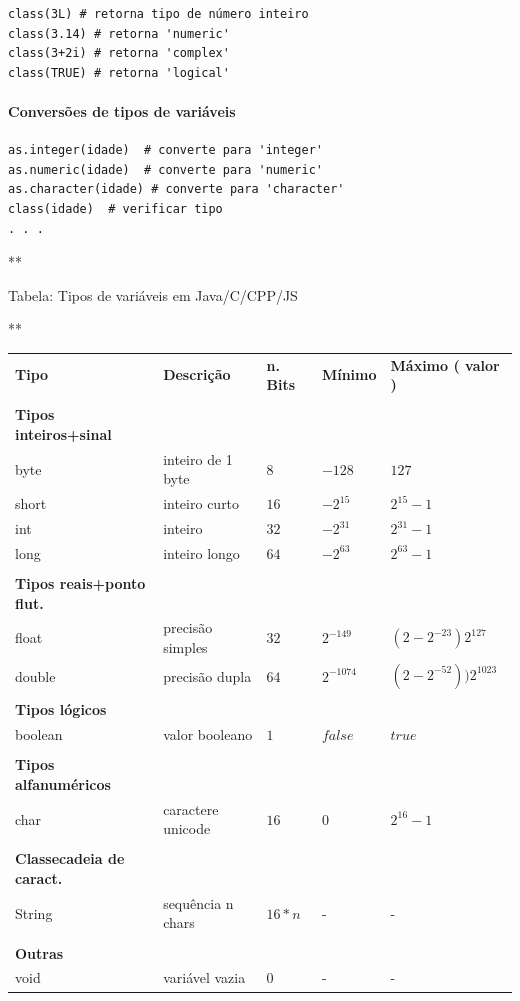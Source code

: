 \documentclass[12pt,a4paper]{article}
\begin{document}
\begin{verbatim}
class(3L) # retorna tipo de número inteiro
class(3.14) # retorna 'numeric'
class(3+2i) # retorna 'complex'
class(TRUE) # retorna 'logical'
\end{verbatim}

    \hypertarget{conversuxf5es-de-tipos-de-variuxe1veis}{%
\paragraph{Conversões de tipos de
variáveis}\label{conversuxf5es-de-tipos-de-variuxe1veis}}

    \begin{verbatim}
as.integer(idade)  # converte para 'integer'
as.numeric(idade)  # converte para 'numeric'
as.character(idade) # converte para 'character'
class(idade)  # verificar tipo
. . .
\end{verbatim}

    **

Tabela: Tipos de variáveis em Java/C/CPP/JS

**

\begin{longtable}[]{@{}lllll@{}}
\toprule
\endhead
\textbf{Tipo} & \textbf{Descrição} & \textbf{n. Bits} & \textbf{Mínimo}
& \textbf{Máximo ( valor )}\tabularnewline
& & & &\tabularnewline
\textbf{Tipos inteiros+sinal} & & & &\tabularnewline
byte & inteiro de 1 byte & \(8\) & \(-128\) & \(127\)\tabularnewline
short & inteiro curto & \(16\) & \(-2^{15}\) &
\(2^{15}-1\)\tabularnewline
int & inteiro & \(32\) & \(-2^{31}\) & \(2^{31}-1\)\tabularnewline
long & inteiro longo & \(64\) & \(-2^{63}\) &
\(2^{63}-1\)\tabularnewline
& & & &\tabularnewline
\textbf{Tipos reais+ponto flut.} & & & &\tabularnewline
float & precisão simples & \(32\) & \(2^{-149}\) &
\((2-2^{-23})2^{127}\)\tabularnewline
double & precisão dupla & \(64\) & \(2^{-1074}\) &
\((2-2^{-52}))2^{1023}\)\tabularnewline
& & & &\tabularnewline
\textbf{Tipos lógicos} & & & &\tabularnewline
boolean & valor booleano & \(1\) & \(false\) & \(true\)\tabularnewline
& & & &\tabularnewline
\textbf{Tipos alfanuméricos} & & & &\tabularnewline
char & caractere unicode & \(16\) & \(0\) & \(2^{16}-1\)\tabularnewline
& & & &\tabularnewline
\textbf{Classecadeia de caract.} & & & &\tabularnewline
String & sequência n chars & \(16*n\) & - & -\tabularnewline
& & & &\tabularnewline
\textbf{Outras} & & & &\tabularnewline
void & variável vazia & \(0\) & - & -\tabularnewline
\bottomrule
\end{longtable}
\end{document}
